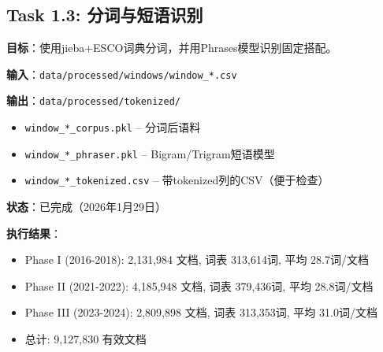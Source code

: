 \documentclass[12pt, a4paper]{ctexart}
\begin{document}
\subsection{Task 1.3: 分词与短语识别}

\textbf{目标}：使用jieba+ESCO词典分词，并用Phrases模型识别固定搭配。

\textbf{输入}：\texttt{data/processed/windows/window\_*.csv}

\textbf{输出}：\texttt{data/processed/tokenized/}
\begin{itemize}
    \item \texttt{window\_*\_corpus.pkl} -- 分词后语料
    \item \texttt{window\_*\_phraser.pkl} -- Bigram/Trigram短语模型
    \item \texttt{window\_*\_tokenized.csv} -- 带tokenized列的CSV（便于检查）
\end{itemize}

\textbf{状态}：已完成（2026年1月29日）

\textbf{执行结果}：
\begin{itemize}
    \item Phase I (2016-2018): 2,131,984 文档, 词表 313,614词, 平均 28.7词/文档
    \item Phase II (2021-2022): 4,185,948 文档, 词表 379,436词, 平均 28.8词/文档
    \item Phase III (2023-2024): 2,809,898 文档, 词表 313,353词, 平均 31.0词/文档
    \item 总计: 9,127,830 有效文档
\end{itemize}
\end{document}
